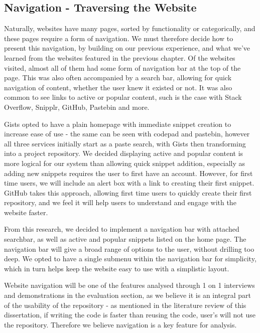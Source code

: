 \subsection{Navigation - Traversing the Website}

Naturally, websites have many pages, sorted by functionality or categorically, and these pages require a form of navigation.
We must therefore decide how to present this navigation, by building on our previous experience, and what we've learned from the websites featured in the previous chapter.
Of the websites visited, almost all of them had some form of navigation bar at the top of the page. 
This was also often accompanied by a search bar, allowing for quick navigation of content, whether the user knew it existed or not.
It was also common to see links to active or popular content, such is the case with Stack Overflow, Snipplr, GitHub, Pastebin and more.

Gists opted to have a plain homepage with immediate snippet creation to increase ease of use - the same can be seen with codepad and pastebin, however all three services initially start as a paste search, with Gists then transforming into a project repository.
We decided displaying active and popular content is more logical for our system than allowing quick snippet addition, especially as adding new snippets requires the user to first have an account.
However, for first time users, we will include an alert box with a link to creating their first snippet. GitHub takes this approach, allowing first time users to quickly create their first repository, and we feel it will help users to understand and engage with the website faster.

From this research, we decided to implement a navigation bar with attached searchbar, as well as active and popular snippets listed on the home page. 
The navigation bar will give a broad range of options to the user, without drilling too deep.
We opted to have a single submenu within the navigation bar for simplicity, which in turn helps keep the website easy to use with a simplistic layout.

Website navigation will be one of the features analysed through 1 on 1 interviews and demonstrations in the evaluation section, as we believe it is an integral part of the usability of the repository - as mentioned in the literature review of this dissertation, if writing the code is faster than reusing the code, user's will not use the repository.
Therefore we believe navigation is a key feature for analysis.

